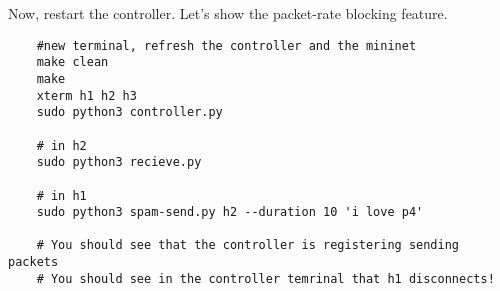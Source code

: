 \documentclass[10pt]{extarticle}
\begin{document}
Now, restart the controller. Let's show the packet-rate blocking feature.
\begin{lstlisting}
    #new terminal, refresh the controller and the mininet
    make clean
    make
    xterm h1 h2 h3
    sudo python3 controller.py
    
    # in h2
    sudo python3 recieve.py

    # in h1
    sudo python3 spam-send.py h2 --duration 10 'i love p4'

    # You should see that the controller is registering sending packets
    # You should see in the controller temrinal that h1 disconnects!
\end{lstlisting}
\end{document}
